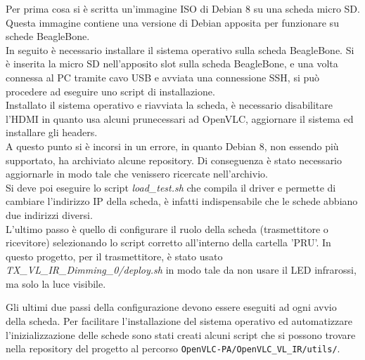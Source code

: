 Per prima cosa si è scritta un'immagine ISO di Debian 8 su una scheda micro SD. Questa immagine contiene una versione di Debian apposita per funzionare su schede BeagleBone.\\
In seguito è necessario installare il sistema operativo sulla scheda BeagleBone. Si è inserita la micro SD nell'apposito slot sulla scheda BeagleBone, e una volta connessa al PC tramite cavo USB e avviata una connessione SSH, si può procedere ad eseguire uno script di installazione.\\
Installato il sistema operativo e riavviata la scheda, è necessario disabilitare l'HDMI in quanto usa alcuni \gls{pru}\glsfirstoccur necessari ad OpenVLC, aggiornare il sistema ed installare gli headers.\\
A questo punto si è incorsi in un errore, in quanto Debian 8, non essendo più supportato, ha archiviato alcune repository. Di conseguenza è stato necessario aggiornarle in modo tale che venissero ricercate nell'archivio.\\
Si deve poi eseguire lo script \textit{load\_test.sh} che compila il driver e permette di cambiare l'indirizzo IP della scheda, è infatti indispensabile che le schede abbiano due indirizzi diversi.\\
L'ultimo passo è quello di configurare il ruolo della scheda (trasmettitore o ricevitore) selezionando lo script corretto all'interno della cartella 'PRU'. In questo progetto, per il trasmettitore, è stato usato \textit{TX\_VL\_IR\_Dimming\_0/deploy.sh} in modo tale da non usare il LED infrarossi, ma solo la luce visibile.

Gli ultimi due passi della configurazione devono essere eseguiti ad ogni avvio della scheda. Per facilitare l'installazione del sistema operativo ed automatizzare l'inizializzazione delle schede sono stati creati alcuni script che si possono trovare nella repository del progetto al percorso \texttt{OpenVLC-PA/OpenVLC\_VL\_IR/utils/}.
